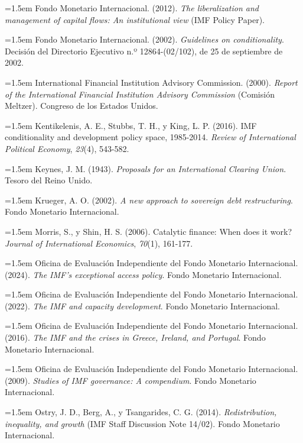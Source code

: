 \documentclass[10pt,a4paper]{article}
\begin{document}
\noindent\hangindent=1.5em Fondo Monetario Internacional. (2012). \textit{The liberalization and management of capital flows: An institutional view} (IMF Policy Paper).

\noindent\hangindent=1.5em Fondo Monetario Internacional. (2002). \textit{Guidelines on conditionality}. Decisión del Directorio Ejecutivo n.º 12864-(02/102), de 25 de septiembre de 2002.

\noindent\hangindent=1.5em International Financial Institution Advisory Commission. (2000). \textit{Report of the International Financial Institution Advisory Commission} (Comisión Meltzer). Congreso de los Estados Unidos.

\noindent\hangindent=1.5em Kentikelenis, A. E., Stubbs, T. H., y King, L. P. (2016). IMF conditionality and development policy space, 1985-2014. \textit{Review of International Political Economy}, \textit{23}(4), 543-582.

\noindent\hangindent=1.5em Keynes, J. M. (1943). \textit{Proposals for an International Clearing Union}. Tesoro del Reino Unido.

\noindent\hangindent=1.5em Krueger, A. O. (2002). \textit{A new approach to sovereign debt restructuring}. Fondo Monetario Internacional.

\noindent\hangindent=1.5em Morris, S., y Shin, H. S. (2006). Catalytic finance: When does it work? \textit{Journal of International Economics}, \textit{70}(1), 161-177.

\noindent\hangindent=1.5em Oficina de Evaluación Independiente del Fondo Monetario Internacional. (2024). \textit{The IMF's exceptional access policy}. Fondo Monetario Internacional.

\noindent\hangindent=1.5em Oficina de Evaluación Independiente del Fondo Monetario Internacional. (2022). \textit{The IMF and capacity development}. Fondo Monetario Internacional.

\noindent\hangindent=1.5em Oficina de Evaluación Independiente del Fondo Monetario Internacional. (2016). \textit{The IMF and the crises in Greece, Ireland, and Portugal}. Fondo Monetario Internacional.

\noindent\hangindent=1.5em Oficina de Evaluación Independiente del Fondo Monetario Internacional. (2009). \textit{Studies of IMF governance: A compendium}. Fondo Monetario Internacional.

\noindent\hangindent=1.5em Ostry, J. D., Berg, A., y Tsangarides, C. G. (2014). \textit{Redistribution, inequality, and growth} (IMF Staff Discussion Note 14/02). Fondo Monetario Internacional.
\end{document}
